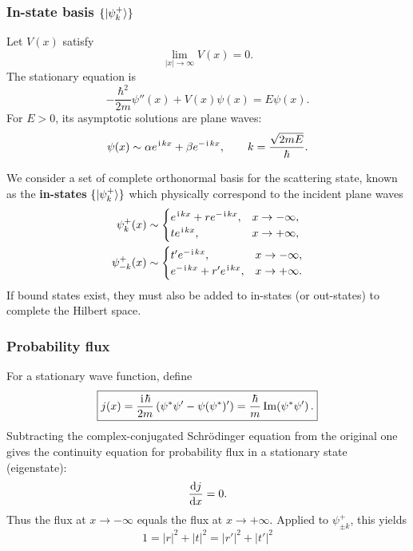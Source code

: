 \subsubsection{In-state basis $\{|{\psi^+_k}\rangle\}$}

Let $V(x)$ satisfy
\begin{equation}
 \lim_{|x|\to\infty}V(x)=0.
\end{equation}
The stationary equation is
\begin{equation}
 -\frac{\hbar^2}{2m}\psi''(x)+V(x)\psi(x)=E\psi(x).
\end{equation}
For $E>0$, its asymptotic solutions are plane waves:
\begin{equation}
 \psi(x)\sim\alpha e^{\hspace{1pt}\mathrm{i}\hspace{1pt} kx}+\beta e^{-\hspace{1pt}\mathrm{i}\hspace{1pt} kx},
 \qquad
 k=\frac{\sqrt{2mE}}{\hbar}.
\end{equation}

We consider a set of complete orthonormal basis for the scattering state, known as the \textbf{in-states} $\{|{\psi^+_k}\rangle\}$ which physically correspond to the incident plane waves
\begin{align}
 \psi_k^+(x)&\sim
 \begin{cases}
 e^{\hspace{1pt}\mathrm{i}\hspace{1pt} kx}+r e^{-\hspace{1pt}\mathrm{i}\hspace{1pt} kx},&x\to-\infty,\\
 t e^{\hspace{1pt}\mathrm{i}\hspace{1pt} kx},&x\to+\infty,
 \end{cases}\\
 \psi_{-k}^+(x)&\sim
 \begin{cases}
 t'e^{-\hspace{1pt}\mathrm{i}\hspace{1pt} kx},&x\to-\infty,\\
 e^{-\hspace{1pt}\mathrm{i}\hspace{1pt} kx}+r'e^{\hspace{1pt}\mathrm{i}\hspace{1pt} kx},&x\to+\infty.
 \end{cases}
\end{align}
If bound states exist, they must also be added to in-states (or out-states) to complete the Hilbert space.


\subsubsection{Probability flux}
For a stationary wave function, define
\begin{equation}
 \boxed{
 j(x)=\frac{\hspace{1pt}\mathrm{i}\hspace{1pt}\hbar}{2m}
 \left(\psi^*\psi'-\psi(\psi^*)'\right)
 =\frac{\hbar}{m}\operatorname{Im}\!\left(\psi^*\psi'\right).}
\end{equation}
Subtracting the complex-conjugated Schr\"odinger equation from the original
one gives the continuity equation for probability flux in a stationary state (eigenstate):
\begin{equation}
 \frac{\mathrm{d} j}{\mathrm{d} x}=0.
\end{equation}
Thus the flux at $x\to-\infty$ equals the flux at $x\to+\infty$. Applied to
$\psi_{\pm k}^{+}$, this yields
\begin{equation}\label{probability flux conservation}
 \boxed{1=|r|^2+|t|^2=|r'|^2+|t'|^2}
\end{equation}

